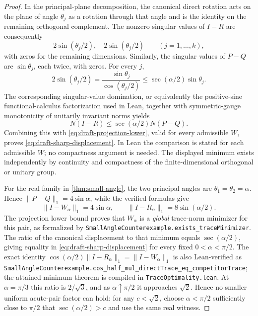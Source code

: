 \begin{proof}
In the principal-plane decomposition, the canonical direct rotation acts
on the plane of angle $\theta_j$ as a rotation through that angle and is
the identity on the remaining orthogonal complement. The nonzero singular
values of $I-R$ are consequently
\[
 2\sin(\theta_j/2),\quad 2\sin(\theta_j/2)
 \qquad (j=1,\ldots,k),
\]
with zeros for the remaining dimensions. Similarly, the singular values of
$P-Q$ are $\sin\theta_j$, each twice, with zeros. For every $j$,
\[
 2\sin(\theta_j/2)
 =\frac{\sin\theta_j}{\cos(\theta_j/2)}
 \leq \sec(\alpha/2)\sin\theta_j.
\]
The corresponding singular-value domination, or equivalently
the positive-sine functional-calculus factorization used in Lean,
together with symmetric-gauge monotonicity of unitarily invariant norms
\citep{bhatia1997matrix} yields
\[
 N(I-R)\leq\sec(\alpha/2)N(P-Q).
\]
Combining this with \cref{eq:draft-projection-lower}, valid for every
admissible $W$, proves \cref{eq:draft-sharp-displacement}. In Lean the comparison is stated for each admissible $W$; no
compactness argument is needed. The displayed minimum exists independently
by continuity and compactness of the finite-dimensional orthogonal or unitary group.

For the real family in \cref{thm:small-angle}, the two principal angles are
$\theta_1=\theta_2=\alpha$. Hence $\|P-Q\|_1=4\sin\alpha$, while the
verified formulas give
\[
 \|I-W_\alpha\|_1=4\sin\alpha,
 \qquad \|I-R_\alpha\|_1=8\sin(\alpha/2).
\]
The projection lower bound proves that $W_\alpha$ is a \emph{global}
trace-norm minimizer for this pair, as formalized by
\texttt{SmallAngleCounterexample.exists\_traceMinimizer}. The ratio of the canonical displacement
to that minimum equals $\sec(\alpha/2)$, giving equality in
\cref{eq:draft-sharp-displacement} for every fixed $0<\alpha<\pi/2$.
The exact identity $\cos(\alpha/2)\|I-R_\alpha\|_1
=\|I-W_\alpha\|_1$ is also Lean-verified as
\texttt{SmallAngleCounterexample.cos\_half\_mul\_directTrace\_eq\_competitorTrace};
the attained-minimum theorem is compiled in
\texttt{TraceOptimality.lean}.
At $\alpha=\pi/3$ this ratio is $2/\sqrt3$, and as
$\alpha\uparrow\pi/2$ it approaches $\sqrt2$. Hence no smaller
uniform acute-pair factor can hold: for any $c<\sqrt2$, choose
$\alpha<\pi/2$ sufficiently close to $\pi/2$ that
$\sec(\alpha/2)>c$ and use the same real witness.
\end{proof}


